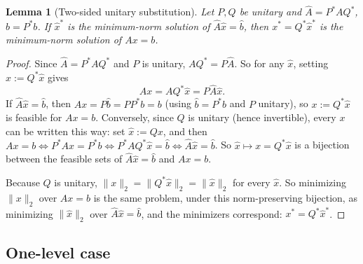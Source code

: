 \documentclass[11pt]{article}
\newtheorem{lemma}{Lemma}
\begin{document}
\begin{lemma}[Two-sided unitary substitution]
\label{lem:twosided}
Let $P,Q$ be unitary and $\hat A=P^*AQ^*$, $\hat b=P^*b$. If $\hat x^*$ is the
minimum-norm solution of $\hat A\hat x=\hat b$, then $x^*=Q^*\hat x^*$ is the
minimum-norm solution of $Ax=b$.
\end{lemma}
\begin{proof}
Since $\hat A=P^*AQ^*$ and $P$ is unitary, $AQ^*=P\hat A$. So for any $\hat x$,
setting $x:=Q^*\hat x$ gives
\[
Ax = AQ^*\hat x = P\hat A\hat x.
\]
If $\hat A\hat x=\hat b$, then $Ax=P\hat b=PP^*b=b$ (using $\hat b=P^*b$ and $P$
unitary), so $x:=Q^*\hat x$ is feasible for $Ax=b$. Conversely, since $Q$ is
unitary (hence invertible), every $x$ can be written this way: set
$\hat x:=Qx$, and then $Ax=b\iff P^*Ax=P^*b\iff P^*AQ^*\hat x=\hat b\iff \hat A\hat x=\hat b$.
So $\hat x\mapsto x=Q^*\hat x$ is a bijection between the feasible sets of
$\hat A\hat x=\hat b$ and $Ax=b$.

Because $Q$ is unitary, $\|x\|_2=\|Q^*\hat x\|_2=\|\hat x\|_2$ for every $\hat x$.
So minimizing $\|x\|_2$ over $Ax=b$ is the same problem, under this
norm-preserving bijection, as minimizing $\|\hat x\|_2$ over $\hat A\hat x=\hat b$,
and the minimizers correspond: $x^*=Q^*\hat x^*$.
\end{proof}

\subsection{One-level case}
\end{document}
